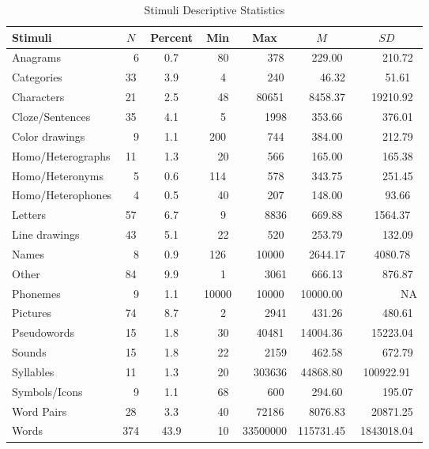 \documentclass[english,,man]{apa6}
\theoremstyle{definition}
\theoremstyle{definition}
\theoremstyle{definition}
\theoremstyle{remark}
\begin{document}
\begin{table}[tbp]
\begin{center}
\begin{threeparttable}
\caption{\label{tab:stim-table}Stimuli Descriptive Statistics}
\small{
\begin{tabular}{lcccccc}
\toprule
Stimuli & $N$ & Percent & Min & Max & $M$ & $SD$\\
\midrule
Anagrams & \ \ 6 & 0.7 & \ \ 80 & \ \ \ \  378 & \ \  229.00 & \ \ \ \ 210.72\\
Categories & 33 & 3.9 & \ \  4 & \ \ \ \  240 & \ \ \ \ 46.32 & \ \ \ \  51.61\\
Characters & 21 & 2.5 & \ \ 48 & \ \  80651 & \ \ 8458.37 & \ \ 19210.92\\
Cloze/Sentences & 35 & 4.1 & \ \  5 & \ \ \ \ 1998 & \ \  353.66 & \ \ \ \ 376.01\\
Color drawings & \ \ 9 & 1.1 & 200 & \ \ \ \  744 & \ \  384.00 & \ \ \ \ 212.79\\
Homo/Heterographs & 11 & 1.3 & \ \ 20 & \ \ \ \  566 & \ \  165.00 & \ \ \ \ 165.38\\
Homo/Heteronyms & \ \ 5 & 0.6 & 114 & \ \ \ \  578 & \ \  343.75 & \ \ \ \ 251.45\\
Homo/Heterophones & \ \ 4 & 0.5 & \ \ 40 & \ \ \ \  207 & \ \  148.00 & \ \ \ \  93.66\\
Letters & 57 & 6.7 & \ \  9 & \ \ \ \ 8836 & \ \  669.88 & \ \  1564.37\\
Line drawings & 43 & 5.1 & \ \ 22 & \ \ \ \  520 & \ \  253.79 & \ \ \ \ 132.09\\
Names & \ \ 8 & 0.9 & 126 & \ \  10000 & \ \ 2644.17 & \ \  4080.78\\
Other & 84 & 9.9 & \ \  1 & \ \ \ \ 3061 & \ \  666.13 & \ \ \ \ 876.87\\
Phonemes & \ \ 9 & 1.1 & 10000 & \ \  10000 & 10000.00 & \ \ \ \ \ \ \ \ NA\\
Pictures & 74 & 8.7 & \ \  2 & \ \ \ \ 2941 & \ \  431.26 & \ \ \ \ 480.61\\
Pseudowords & 15 & 1.8 & \ \ 30 & \ \  40481 & 14004.36 & \ \ 15223.04\\
Sounds & 15 & 1.8 & \ \ 22 & \ \ \ \ 2159 & \ \  462.58 & \ \ \ \ 672.79\\
Syllables & 11 & 1.3 & \ \ 20 & \ \ 303636 & 44868.80 & 100922.91\\
Symbols/Icons & \ \ 9 & 1.1 & \ \ 68 & \ \ \ \  600 & \ \  294.60 & \ \ \ \ 195.07\\
Word Pairs & 28 & 3.3 & \ \ 40 & \ \  72186 & \ \ 8076.83 & \ \ 20871.25\\
Words & 374 & 43.9 & \ \ 10 & 33500000 & 115731.45 & 1843018.04\\
\bottomrule
\end{tabular}
}
\end{threeparttable}
\end{center}
\end{table}
\end{document}
